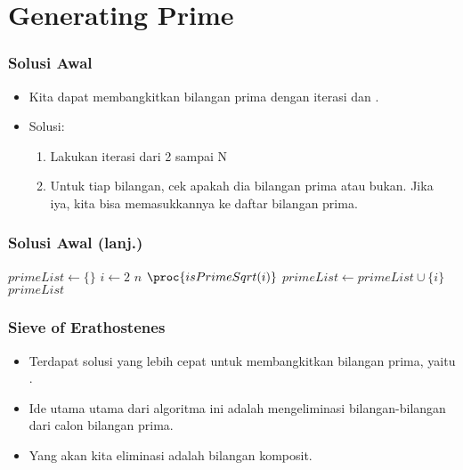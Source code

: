
\section{Generating Prime}
\frame{\sectionpage}

\begin{frame}
\frametitle{Solusi Awal}
\begin{itemize}
  \item Kita dapat membangkitkan bilangan prima dengan iterasi dan .
  \item Solusi: 
  \begin{enumerate}
    \item Lakukan iterasi dari 2 sampai N
    \item Untuk tiap bilangan, cek apakah dia bilangan prima atau bukan. Jika iya, kita bisa memasukkannya ke daftar bilangan prima.
  \end{enumerate}
\end{itemize}
\end{frame}

\begin{frame}
\frametitle{Solusi Awal (lanj.)}
\begin{codebox}
\li $primeList \gets \{\}$
\li \For $i \gets 2$ \To $n$
    \Do
\li   \If $\proc{isPrimeSqrt(i)}$
      \Then
\li     $primeList \gets primeList \cup \{i\}$
      \End    
    \End
\li \Return $primeList$
\end{codebox}
\end{frame}

\begin{frame}
\frametitle{Sieve of Erathostenes}
\begin{itemize}
  \item Terdapat solusi yang lebih cepat untuk membangkitkan bilangan prima, yaitu .
  \item Ide utama utama dari algoritma ini adalah mengeliminasi bilangan-bilangan dari calon bilangan prima.
  \item Yang akan kita eliminasi adalah bilangan komposit.
\end{itemize}
\end{frame}

